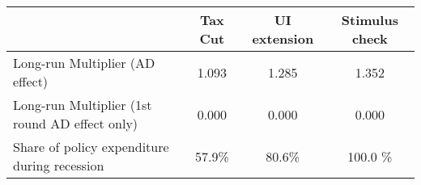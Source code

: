 \begin{tabular}{@{}lccc@{}} 
\toprule 
& Tax Cut    & UI extension    & Stimulus check    \\  \midrule 
Long-run Multiplier (AD effect) &1.093  & 1.285  & 1.352     \\ 
Long-run Multiplier (1st round AD effect only) &0.000  & 0.000  & 0.000     \\ 
Share of policy expenditure during recession &57.9\%  & 80.6\%  & 100.0 \%    \\ 
\end{tabular}  
